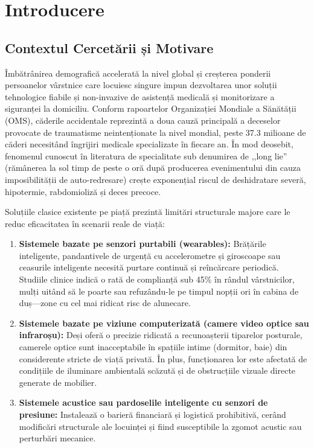 \chapter{Introducere}
\label{chap:introducere}

\section{Contextul Cercetării și Motivare}
Îmbătrânirea demografică accelerată la nivel global și creșterea ponderii persoanelor vârstnice care locuiesc singure impun dezvoltarea unor soluții tehnologice fiabile și non-invazive de asistență medicală și monitorizare a siguranței la domiciliu. Conform rapoartelor Organizației Mondiale a Sănătății (OMS), căderile accidentale reprezintă a doua cauză principală a deceselor provocate de traumatisme neintenționate la nivel mondial, peste 37.3 milioane de căderi necesitând îngrijiri medicale specializate în fiecare an. În mod deosebit, fenomenul cunoscut în literatura de specialitate sub denumirea de ,,long lie'' (rămânerea la sol timp de peste o oră după producerea evenimentului din cauza imposibilității de auto-redresare) crește exponențial riscul de deshidratare severă, hipotermie, rabdomioliză și deces precoce.

Soluțiile clasice existente pe piață prezintă limitări structurale majore care le reduc eficacitatea în scenarii reale de viață:
\begin{enumerate}
    \item \textbf{Sistemele bazate pe senzori purtabili (wearables):} Brățările inteligente, pandantivele de urgență cu accelerometre și giroscoape sau ceasurile inteligente necesită purtare continuă și reîncărcare periodică. Studiile clinice indică o rată de complianță sub 45\% în rândul vârstnicilor, mulți uitând să le poarte sau refuzându-le pe timpul nopții ori în cabina de duș—zone cu cel mai ridicat risc de alunecare.
    \item \textbf{Sistemele bazate pe viziune computerizată (camere video optice sau infraroșu):} Deși oferă o precizie ridicată a recunoașterii tiparelor posturale, camerele optice sunt inacceptabile în spațiile intime (dormitor, baie) din considerente stricte de viață privată. În plus, funcționarea lor este afectată de condițiile de iluminare ambientală scăzută și de obstrucțiile vizuale directe generate de mobilier.
    \item \textbf{Sistemele acustice sau pardoselile inteligente cu senzori de presiune:} Instalează o barieră financiară și logistică prohibitivă, cerând modificări structurale ale locuinței și fiind susceptibile la zgomot acustic sau perturbări mecanice.
\end{enumerate}

